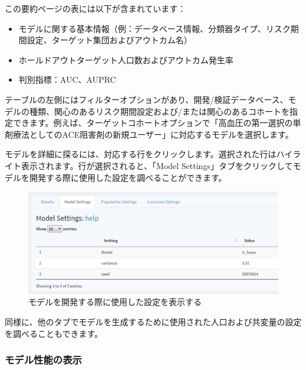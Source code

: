 \documentclass[
  11pt]{book}
\providecommand{\tightlist}{%
  \setlength{\itemsep}{0pt}\setlength{\parskip}{0pt}}
\theoremstyle{definition}
\theoremstyle{definition}
\theoremstyle{definition}
\theoremstyle{definition}
\theoremstyle{remark}
\begin{document}
この要約ページの表には以下が含まれています：

\begin{itemize}
\tightlist
\item
  モデルに関する基本情報（例：データベース情報、分類器タイプ、リスク期間設定、ターゲット集団およびアウトカム名）
\item
  ホールドアウトターゲット人口数およびアウトカム発生率
\item
  判別指標：AUC、AUPRC
\end{itemize}

テーブルの左側にはフィルターオプションがあり、開発/検証データベース、モデルの種類、関心のあるリスク期間設定および/または関心のあるコホートを指定できます。例えば、ターゲットコホートオプションで「高血圧の第一選択の単剤療法としてのACE阻害剤の新規ユーザー」に対応するモデルを選択します。

モデルを詳細に探るには、対応する行をクリックします。選択された行はハイライト表示されます。行が選択されると、「Model Settings」タブをクリックしてモデルを開発する際に使用した設定を調べることができます。

\begin{figure}

{\centering \includegraphics[width=1\linewidth]{images/PatientLevelPrediction/shiny/shinyModel} 

}

\caption{モデルを開発する際に使用した設定を表示する}\label{fig:shinyModel}
\end{figure}

同様に、他のタブでモデルを生成するために使用された人口および共変量の設定を調べることもできます。

\subsubsection*{モデル性能の表示}\label{ux30e2ux30c7ux30ebux6027ux80fdux306eux8868ux793a}
\end{document}
